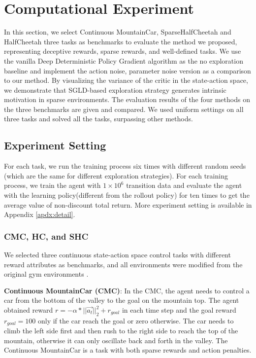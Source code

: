 \section{Computational Experiment}
In this section, we select Continuous MountainCar, SparseHalfCheetah and HalfCheetah three tasks as benchmarks to evaluate the method we proposed, representing deceptive rewards, sparse rewards, and well-defined tasks. We use the vanilla Deep Deterministic Policy Gradient algorithm as the no exploration baseline and implement the action noise, parameter noise version as a comparison to our method. By visualizing the variance of the critic in the state-action space, we demonstrate that SGLD-based exploration strategy generates intrinsic motivation in sparse environments. The evaluation results of the four methods on the three benchmarks are given and compared. We used uniform settings on all three tasks and solved all the tasks, surpassing other methods.

\subsection{Experiment Setting}
For each task, we run the training process six times with different random seeds (which are the same for different exploration strategies). For each training process, we train the agent with $1\times10^6$ transition data and evaluate the agent with the learning policy(different from the rollout policy) for ten times to get the average value of non-discount total return. More experiment setting is available in Appendix \ref{apdx:detail}.

\subsubsection{CMC, HC, and SHC}
We selected three continuous state-action space control tasks with different reward attributes as benchmarks, and all environments were modified from the original gym environments \cite{gym}.

\textbf{Continuous MountainCar (CMC)}\cite{MC}: In the CMC, the agent needs to control a car from the bottom of the valley to the goal on the mountain top. The agent obtained reward $r = -\alpha*||\vec{a_t}||^2_2 + r_{goal}$ in each time step and the goal reward $r_{goal}=100$ only if the car reach the goal or zero otherwise. The car needs to climb the left side first and then rush to the right side to reach the top of the mountain, otherwise it can only oscillate back and forth in the valley. The Continuous MountainCar is a task with both sparse rewards and action penalties.

